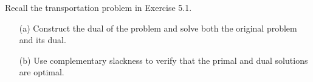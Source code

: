 Recall the transportation problem in Exercise 5.1.

\begin{itemize}
\item[(a)] Construct the dual of the problem and solve both the original problem and its dual. 
\item[(b)] Use complementary slackness to verify that the primal and dual solutions are optimal.
\end{itemize}
%
